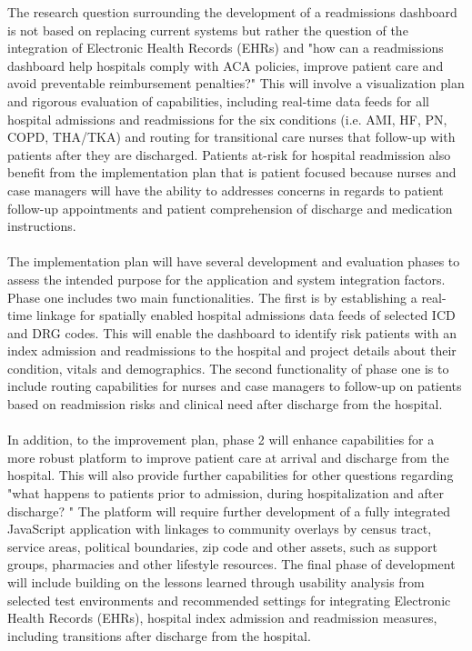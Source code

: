 \documentclass[11pt]{article}\usepackage[]{graphicx}\usepackage[]{color}
\begin{document}
The  research question surrounding the development of a readmissions dashboard is not based on replacing current systems but rather the question of the integration of Electronic Health Records (EHRs) and "how can a readmissions dashboard help hospitals comply with ACA policies, improve patient care and avoid preventable reimbursement penalties?" This will involve a visualization plan and rigorous evaluation of capabilities, including real-time data feeds for all hospital admissions and readmissions for the six conditions (i.e. AMI, HF, PN, COPD, THA/TKA) and routing for transitional care nurses that follow-up with patients after they are discharged. Patients at-risk for hospital readmission also benefit from the implementation plan that is patient focused because nurses and case managers will have the ability to addresses concerns in regards to patient follow-up appointments and patient comprehension of discharge and medication instructions.
\paragraph{}
The implementation plan will have several development and evaluation phases to assess the intended purpose for the application and system integration factors. Phase one includes two main functionalities. The first is by establishing a real-time linkage for spatially enabled hospital admissions data feeds of selected ICD and DRG codes. This will enable the dashboard to identify risk patients with an index admission and readmissions to the hospital and project details about their condition, vitals and demographics. The second functionality of phase one is to include routing capabilities for nurses and case managers to follow-up on patients based on readmission risks and clinical need after discharge from the hospital. 
\paragraph{}
In addition, to the improvement plan, phase 2 will enhance capabilities for a more robust platform to improve patient care at arrival and discharge from the hospital. This will also provide further capabilities for other questions regarding "what happens to patients prior to admission, during hospitalization and after discharge? " The platform will require further development of a fully integrated JavaScript application with linkages to community overlays by census tract, service areas, political boundaries, zip code and other assets, such as support groups, pharmacies and other lifestyle resources. The final phase of development will include building on the lessons learned through usability analysis from selected test environments and recommended settings for integrating Electronic Health Records (EHRs), hospital index admission and readmission measures, including transitions after discharge from the hospital.
\end{document}
